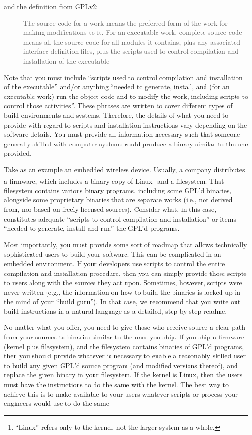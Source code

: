 and the definition from GPLv2:
\begin{quote}
The source code for a work means the preferred form of the work for making
modifications to it.  For an executable work, complete source code means
all the source code for all modules it contains, plus any associated
interface definition files, plus the scripts used to control compilation
and installation of the executable.
\end{quote}

Note that you must include ``scripts used to control compilation and
installation of the executable'' and/or anything ``needed to generate,
install, and (for an executable work) run the object code and to modify
the work, including scripts to control those activities''.  These phrases
are written to cover different types of build environments and systems.
Therefore, the details of what you need to provide with regard to scripts
and installation instructions vary depending on the software details.  You
must provide all information necessary such that someone generally skilled
with computer systems could produce a binary similar to the one provided.

Take as an example an embedded wireless device.  Usually, a company
distributes a firmware, which includes a binary copy of
Linux\footnote{``Linux'' refers only to the kernel, not the larger system
  as a whole.} and a filesystem.  That filesystem contains various binary
programs, including some GPL'd binaries, alongside some proprietary
binaries that are separate works (i.e., not derived from, nor based on
freely-licensed sources).  Consider what, in this case, constitutes adequate
``scripts to control compilation and installation'' or items ``needed to
generate, install and run'' the GPL'd programs.

Most importantly, you must provide some sort of roadmap that allows
technically sophisticated users to build your software.  This can be
complicated in an embedded environment.  If your developers use scripts to
control the entire compilation and installation procedure, then you can
simply provide those scripts to users along with the sources they act
upon.  Sometimes, however, scripts were never written (e.g., the
information on how to build the binaries is locked up in the mind of your
``build guru'').  In that case, we recommend that you write out build
instructions in a natural language as a detailed, step-by-step {\sc
  readme}.

No matter what you offer, you need to give those who receive source a
clear path from your sources to binaries similar to the ones you ship.  If
you ship a firmware (kernel plus filesystem), and the filesystem contains
binaries of GPL'd programs, then you should provide whatever is necessary
to enable a reasonably skilled user to build any given GPL'd source
program (and modified versions thereof), and replace the given binary in
your filesystem.  If the kernel is Linux, then the users must have the
instructions to do the same with the kernel.  The best way to achieve this
is to make available to your users whatever scripts or process your
engineers would use to do the same.

